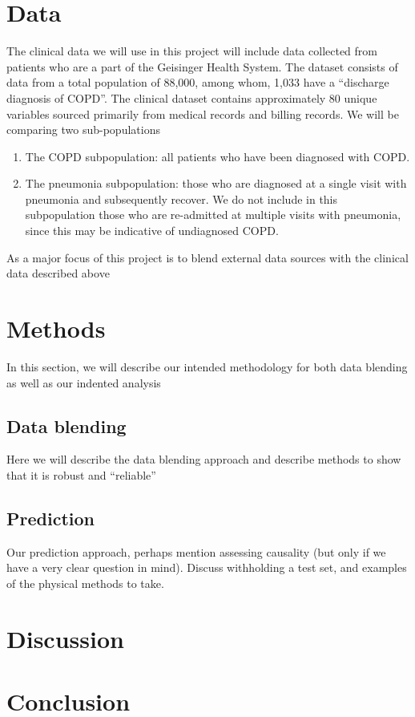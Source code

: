 \documentclass{article}
\begin{document}
\section{Data}

The clinical data we will use in this project will include data collected from patients who are a part of the Geisinger Health System. The dataset consists of data from a total population of 88,000, among whom, 1,033 have a ``discharge diagnosis of COPD''. The clinical dataset contains approximately 80 unique variables sourced primarily from medical records and billing records. We will be comparing two sub-populations

\begin{enumerate}
\item The COPD subpopulation: all patients who have been diagnosed with COPD.
\item The pneumonia subpopulation: those who are diagnosed at a single visit with pneumonia and subsequently recover. We do not include in this subpopulation those who are re-admitted at multiple visits with pneumonia, since this may be indicative of undiagnosed COPD.
\end{enumerate}



As a major focus of this project is to blend external data sources with the clinical data described above


\section{Methods}

In this section, we will describe our intended methodology for both data blending as well as our indented analysis

\subsection{Data blending}

Here we will describe the data blending approach and describe methods to show that it is robust and ``reliable''

\subsection{Prediction}

Our prediction approach, perhaps mention assessing causality (but only if we have a very clear question in mind). Discuss withholding a test set, and examples of the physical methods to take.


\section{Discussion}



\section{Conclusion}
\end{document}
